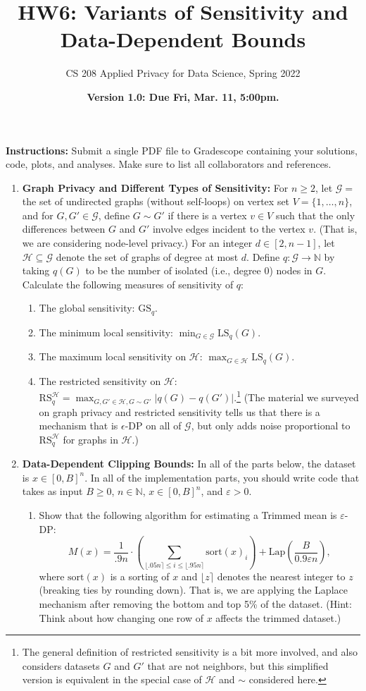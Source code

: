 \documentclass[11pt]{article}
\title{\vspace{-1.5cm} HW6: Variants of Sensitivity and Data-Dependent Bounds}
\author{CS 208 Applied Privacy for Data Science, Spring 2022}
\date{\textbf{Version 1.0: Due Fri, Mar. 11, 5:00pm.}}
\newcommand{\instructions}{\noindent \textbf{Instructions:} Submit a single PDF file to Gradescope containing your solutions, code, plots, and analyses. Make sure to list all collaborators and references.}
\theoremstyle{plain}
\theoremstyle{definition}
\theoremstyle{solution}
\newcommand{\N}{\mathbb{N}}
\newcommand{\eps}{\epsilon}
\newcommand{\cH}{\mathcal{H}}
\newcommand{\cG}{\mathcal{G}}
\newcommand{\GS}{\mathrm{GS}}
\newcommand{\LS}{\mathrm{LS}}
\newcommand{\RS}{\mathrm{RS}}
\newcommand{\sort}{\mathrm{sort}}
\begin{document}
\maketitle

\instructions

\begin{enumerate}[leftmargin=*]

\item \textbf{Graph Privacy and Different Types of Sensitivity:} 
For $n\geq 2$, let $\cG = $ the set of undirected graphs (without self-loops) on vertex set $V=\{1,\ldots,n\}$, and for $G,G'\in \cG$, define $G\sim G'$ if there is a vertex $v\in V$ such that the only differences between $G$ and $G'$ involve edges incident to the vertex $v$.  (That is, we are considering node-level privacy.)
For an integer $d\in [2,n-1]$, let $\cH \subseteq \cG$ denote the set of graphs of degree at most $d$.
Define $q : \cG \rightarrow \N$ by taking $q(G)$ to be the number of isolated (i.e., degree $0$) nodes in $G$.
Calculate the following measures of sensitivity of $q$:
\begin{enumerate}
    \item The global sensitivity: $\GS_q$.
    \item The minimum local sensitivity: $\min_{G\in \cG} \LS_q(G)$.
    \item The maximum local sensitivity on $\cH$: $\max_{G\in \cH} \LS_q(G)$.
    \item The restricted sensitivity on $\cH$: $\RS_q^{\cH} = \max_{G,G'\in \cH, G\sim G'} |q(G)-q(G')|$.\footnote{The general definition of restricted sensitivity is a bit more involved, and also considers datasets $G$ and $G'$ that are not neighbors, but this simplified version is equivalent in the special case of $\cH$ and $\sim$ considered here.}
    (The material we surveyed on graph privacy and restricted sensitivity tells us that there is a mechanism that is $\eps$-DP on all of $\cG$, but only adds noise proportional to $\RS_q^{\cH}$ for graphs in $\cH$.)
\end{enumerate}

\item \textbf{Data-Dependent Clipping Bounds:} In all of the parts below, the dataset is $x\in [0,B]^n$.   In all of the implementation parts, you should write
code that takes as input $B\geq 0$, $n\in\mathbb{N}$, $x\in [0,B]^n$, and $\varepsilon>0$.

\begin{enumerate}
\item Show that the following algorithm for estimating a Trimmed mean is $\varepsilon$-DP:
$$M(x) = \frac{1}{.9n}\cdot \left(\sum_{\lfloor .05n \rceil\leq i \leq \lfloor .95n \rceil} \sort(x)_i\right) +\mathrm{Lap}\left(\frac{B}{0.9\varepsilon n}\right),$$
where $\sort(x)$ is a sorting of $x$ and $\lfloor z\rceil$ denotes the nearest integer to $z$ (breaking ties by rounding down).  That is, we are applying the Laplace mechanism after removing the bottom and top 5\% of the dataset.
(Hint: Think about how changing one row of $x$ affects the trimmed dataset.)
\label{part:TrimLap}


\end{enumerate}
\end{enumerate}
\end{document}
